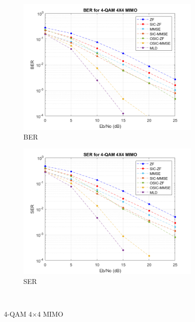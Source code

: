 \documentclass{article}
\begin{document}
\begin{figure}[H]
	\centering
	\begin{subfigure}{0.5\textwidth}
		\centerline{\includegraphics[width=1\textwidth]{BER_4x4_4qam2.png}}
		\caption{BER}
	\end{subfigure}%
	\begin{subfigure}{0.5\textwidth}
		\centerline{\includegraphics[width=1\textwidth]{SER_4x4_4qam2.png}}
		\caption{SER}
	\end{subfigure}\\%
	\caption{4-QAM 4$\times$4 MIMO}
\end{figure}
\end{document}
